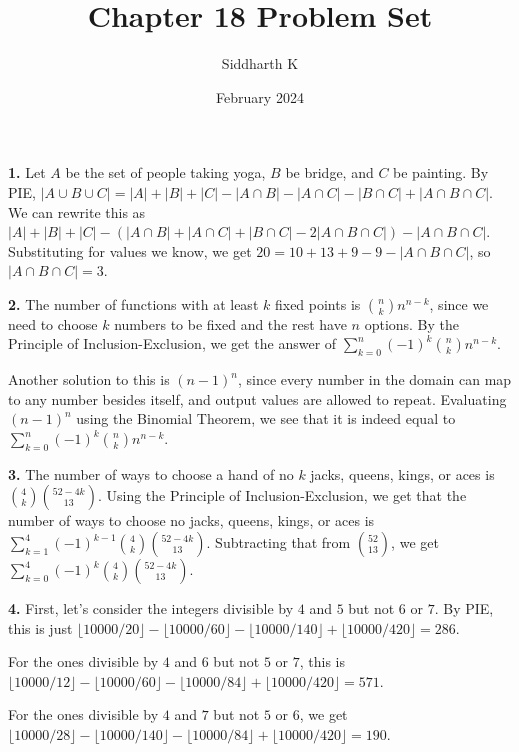 \documentclass{article}
\title{Chapter 18 Problem Set}
\author{Siddharth K}
\date{February 2024}
\begin{document}
\maketitle

\textbf{1.} Let $A$ be the set of people taking yoga, $B$ be bridge, and $C$ be painting. By PIE, $|A\cup B\cup C| = |A| + |B| + |C| - |A\cap B| - |A\cap C| - |B\cap C| + |A\cap B\cap C|$. We can rewrite this as $|A| + |B| + |C| - (|A\cap B| + |A\cap C| + |B\cap C| - 2|A\cap B\cap C|) - |A\cap B\cap C|$. Substituting for values we know, we get $20 = 10 + 13 + 9 - 9 - |A\cap B\cap C|$, so $|A\cap B\cap C| = 3$.
\newline

\textbf{2.} The number of functions with at least $k$ fixed points is ${n\choose k}n^{n - k}$, since we need to choose $k$ numbers to be fixed and the rest have $n$ options. By the Principle of Inclusion-Exclusion, we get the answer of $\sum_{k = 0}^n (-1)^k{n\choose k}n^{n - k}$.
\newline

Another solution to this is $(n - 1)^n$, since every number in the domain can map to any number besides itself, and output values are allowed to repeat. Evaluating $(n - 1)^n$ using the Binomial Theorem, we see that it is indeed equal to $\sum_{k = 0}^n (-1)^k{n\choose k}n^{n - k}$.
\newline

\textbf{3.} The number of ways to choose a hand of no $k$ jacks, queens, kings, or aces is ${4\choose k}{{52 - 4k}\choose {13}}$. Using the Principle of Inclusion-Exclusion, we get that the number of ways to choose no jacks, queens, kings, or aces is $\sum_{k = 1}^4 (-1)^{k - 1}{4\choose k}{{52 - 4k}\choose {13}}$. Subtracting that from ${{52}\choose {13}}$, we get $\sum_{k = 0}^4 (-1)^k{4\choose k}{{52 - 4k}\choose {13}}$.
\newline

\textbf{4.} First, let's consider the integers divisible by $4$ and $5$ but not $6$ or $7$. By PIE, this is just $\lfloor 10000/20\rfloor - \lfloor 10000/60\rfloor - \lfloor 10000/140\rfloor + \lfloor 10000/420\rfloor = 286$.

For the ones divisible by $4$ and $6$ but not $5$ or $7$, this is $\lfloor 10000/12 \rfloor - \lfloor 10000/60 \rfloor - \lfloor 10000/84 \rfloor + \lfloor 10000/420 \rfloor = 571$.

For the ones divisible by $4$ and $7$ but not $5$ or $6$, we get $\lfloor 10000/28 \rfloor - \lfloor 10000/140 \rfloor - \lfloor 10000/84 \rfloor + \lfloor 10000/420 \rfloor = 190$.
\end{document}
